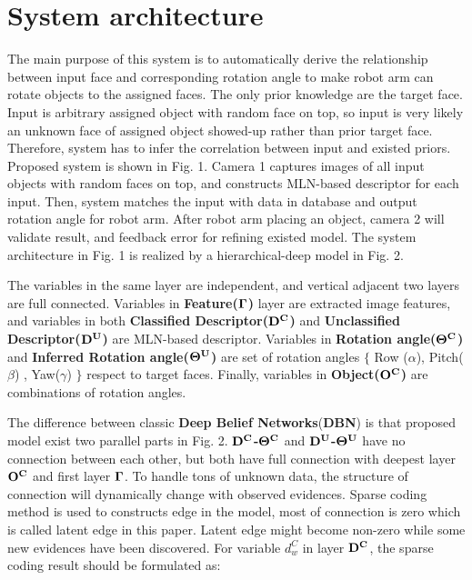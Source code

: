 \documentclass{tADR2e}
\begin{document}
\section{System architecture}
The main purpose of this system is to automatically derive the relationship between input face and corresponding rotation angle to make robot arm can rotate objects to the assigned faces. The only prior knowledge are the target face. Input is arbitrary assigned object with random face on top, so input is very likely an unknown face of assigned object showed-up rather than prior target face. Therefore, system has to infer the correlation between input and existed priors.  Proposed system is shown in Fig. 1. Camera 1 captures images of all input objects with random faces on top, and constructs MLN-based descriptor for each input. Then, system matches the input with data in database and output rotation angle for robot arm. After robot arm placing an object, camera 2 will validate result, and feedback error for refining existed model. The system architecture in Fig. 1 is realized by a hierarchical-deep model in Fig. 2. 

The variables in the same layer are independent, and vertical adjacent two layers are full connected. Variables in \textbf{Feature($\bf{\Gamma}$)} layer are extracted image features, and variables in both \textbf{Classified Descriptor($\bf{D^C}$)} and \textbf{Unclassified Descriptor($\bf{D^U}$)} are MLN-based descriptor. Variables in \textbf{Rotation angle($\bf{\Theta^{C}}$)} and \textbf{Inferred Rotation angle($\bf{\Theta^U}$)} are set of rotation angles $\{$ Row ($\alpha$), Pitch($\beta$) , Yaw($\gamma$) $\}$ respect to target faces. Finally, variables in \textbf{Object($\bf{O^C}$)} are combinations of rotation angles.


The difference between classic \textbf{Deep Belief Networks}(\textbf{DBN}) is that proposed model exist two parallel parts in Fig. 2. \textbf{$\bf{D^C}$-$\bf{\Theta^{C}}$} and \textbf{$\bf{D^U}$-$\bf{\Theta^U}$} have no connection between each other, but both have full connection with deepest layer $\bf{O^C}$ and first layer \textbf{$\bf\Gamma$}. To handle tons of unknown data, the structure of connection will dynamically change with observed evidences. Sparse coding method is used to constructs edge in the model, most of connection is zero which is called latent edge in this paper. Latent edge might become non-zero while some new evidences have been discovered. For variable $d^C_w$ in layer $\bf{D^C}$, the sparse coding result should be formulated as:
\end{document}
